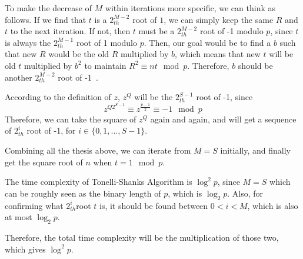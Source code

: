 \documentclass[catalog.tex]{subfiles}
\begin{document}
To make the decrease of $M$ within iterations more specific, we can think as follows. If we find that $t$ is a $2^{M-2}_{th}$ root of $1$, we can simply keep the same $R$ and $t$ to the next iteration. If not, then $t$ must be a $2^{M-2}_{th}$ root of -1 modulo $p$, since $t$ is always the $2^{M-1}_{th}$ root of 1 modulo $p$. Then, our goal would be to find a $b$ such that new $R$ would be the old $R$ multiplied by $b$, which means that new $t$ will be old $t$ multiplied by $b^2$ to maintain $R^2 \equiv nt \mod p$. Therefore, $b$ should be another $2^{M-2}_{th}$ root of -1~\cite{TS}.

According to the definition of $z$, $z^Q$ will be the $2^{S-1}_{th}$ root of -1, since 
$$z^{Q2^{S-1}} \equiv z^{\frac{p-1}{2}} \equiv -1 \mod p$$
Therefore, we can take the square of $z^Q$ again and again, and will get a sequence of $2^{i}_{th}$ root of -1, for $i\in \{0,1,\dots,S-1\}$.

Combining all the thesis above, we can iterate from $M = S$ initially, and finally get the square root of $n$ when $t = 1 \mod p$.

The time complexity of Tonelli-Shanks Algorithm is $\log^2 p$, since $M = S$ which can be roughly seen as the binary length of $p$, which is $\log_2 p$. Also, for confirming what $2^{i}_{th}$root $t$ is, it should be found between $0 < i < M$, which is also at most $\log_2 p$.

Therefore, the total time complexity will be the multiplication of those two, which gives $\log^2 p$.
\end{document}
